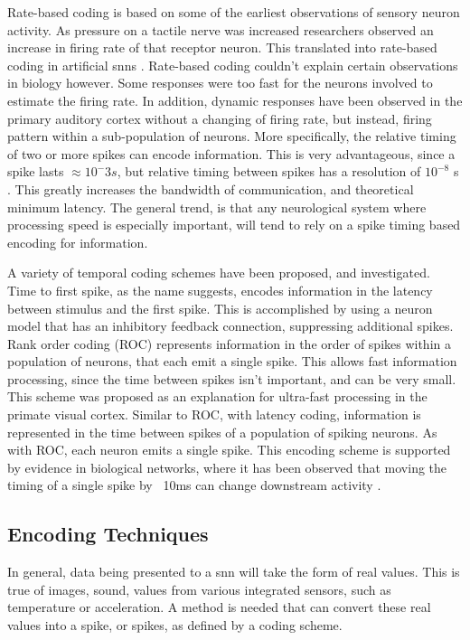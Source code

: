     Rate-based coding is based on some of the earliest observations of sensory
    neuron activity. As pressure on a tactile nerve was increased researchers
    observed an increase in firing rate of that receptor neuron. This translated
    into rate-based coding in artificial \Glspl{snn} \parencite{ponulak_2011}. Rate-based
    coding couldn't explain certain observations in biology however. Some
    responses were too fast for the neurons involved to estimate the firing
    rate. In addition, dynamic responses have been observed in the primary
    auditory cortex without a changing of firing rate, but instead, firing
    pattern within a sub-population of neurons. More specifically, the relative
    timing of two or more spikes can encode information. This is very
    advantageous, since a spike lasts $\approx 10^-3s$, but relative timing
    between spikes has a resolution of $10^{-8}$ s \parencite{ponulak_2011}. This
    greatly increases the bandwidth of communication, and theoretical minimum
    latency. The general trend, is that any neurological system where processing
    speed is especially important, will tend to rely on a spike timing based
    encoding for information.
    
    A variety of temporal coding schemes have been proposed, and
    investigated. Time to first spike, as the name suggests, encodes information
    in the latency between stimulus and the first spike. This is accomplished by
    using a neuron model that has an inhibitory feedback connection, suppressing
    additional spikes. Rank order coding (ROC) represents information in the
    order of spikes within a population of neurons, that each emit a single
    spike. This allows fast information processing, since the time between
    spikes isn't important, and can be very small. This scheme was proposed as
    an explanation for ultra-fast processing in the primate visual
    cortex. Similar to ROC, with latency coding, information is represented in
    the time between spikes of a population of spiking neurons. As with ROC,
    each neuron emits a single spike. This encoding scheme is supported by
    evidence in biological networks, where it has been observed that moving the
    timing of a  single spike by ~10ms can change downstream activity
    \parencite{ponulak_2011}.
        
    \subsection{Encoding Techniques}
    In general, data being presented to a \Gls{snn} will take the form of real
    values. This is true of images, sound, values from various integrated
    sensors, such as temperature or acceleration. A method is needed that can
    convert these real values into a spike, or spikes, as defined by a coding
    scheme.
    
